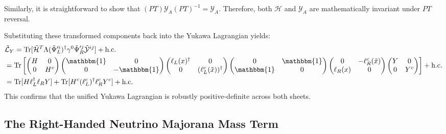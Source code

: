 Similarly, it is straightforward to show that $(PT)\mathcal{Y}_A(PT)^{-1}=\mathcal{Y}_A$. Therefore, both $\mathcal{H}$ and $\mathcal{Y}_A$ are mathematically invariant under $PT$ reversal.

Substituting these transformed components back into the Yukawa Lagrangian yields: 
\begin{equation}
\begin{aligned}
    &\tilde{\mathcal{L}}_{Y}=
    \text{Tr}[\tilde {\mathcal{H}}^{T}\Lambda(\tilde\Psi_{L}'^{i})^\dagger\gamma^0\tilde\Psi_{R}'^j \tilde{\mathcal{Y}}^{ij}] + \text{h.c.} \\
    &=\text{Tr}\left[\begin{pmatrix} H & 0 \\ 0 & H^{c} \end{pmatrix}\begin{pmatrix} \mathbbm{1} & 0 \\ 0 & -\mathbbm{1} \end{pmatrix}\begin{pmatrix}\ell_L(x)^\dagger&0\\ 0 & (\ell_L^c(\tilde x))^\dagger\end{pmatrix}\begin{pmatrix} 0 & \mathbbm{1} \\ \mathbbm{1}& 0 \end{pmatrix}\begin{pmatrix}0&-\ell_R^c(\tilde x)\\ \ell_R(x) &0 \end{pmatrix} \begin{pmatrix} Y & 0 \\ 0 & Y^{c} \end{pmatrix}\right] + \text{h.c.}\\
    &=\text{Tr}[H\ell_L^\dagger\ell_RY]+\text{Tr}[H^c(\ell_L^c)^\dagger\ell_R^cY^c]+ \text{h.c.}
\end{aligned}
\end{equation}
This confirms that the unified Yukawa Lagrangian is robustly positive-definite across both sheets.

\vspace{0.25cm}
\subsection{The Right-Handed Neutrino Majorana Mass Term}

